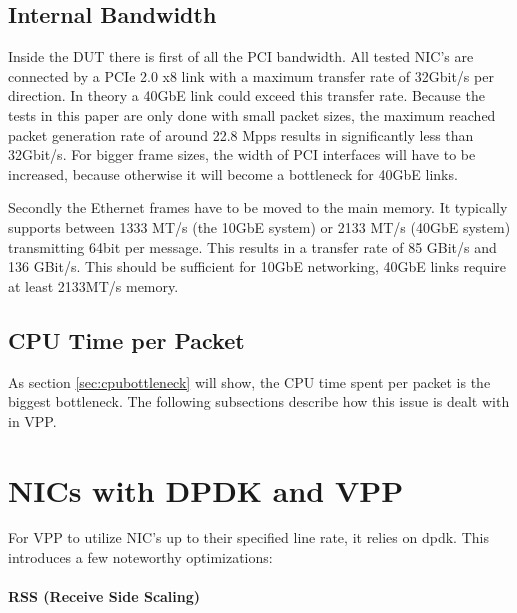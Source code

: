 
\subsection{Internal Bandwidth}


Inside the DUT there is first of all the PCI bandwidth. All tested
NIC's are connected by a PCIe 2.0 x8 link with a maximum transfer rate
of 32Gbit/s per direction. In theory a 40GbE link could exceed this
transfer rate. Because the tests in this paper are only done with
small packet sizes, the maximum reached packet generation rate of
around 22.8 Mpps results in significantly less than 32Gbit/s. For
bigger frame sizes, the width of PCI interfaces will have to be
increased, because otherwise it will become a bottleneck for
40GbE links.


Secondly the Ethernet frames have to be moved to the main memory. It
typically supports between 1333 MT/s (the 10GbE system) or 2133 MT/s
(40GbE system) transmitting 64bit per message. This results in a
transfer rate of 85 GBit/s and 136 GBit/s. This should be sufficient
for 10GbE networking, 40GbE links require at least 2133MT/s memory.

\subsection{CPU Time per Packet}

As section \ref{sec:cpubottleneck} will show, the CPU time spent per
packet is the biggest bottleneck. The following subsections describe
how this issue is dealt with in VPP.




\section{NICs with DPDK and VPP}

For VPP to utilize NIC's up to their specified line rate, it relies on
\Ac{dpdk}. This introduces a few noteworthy optimizations:

\paragraph{RSS (Receive Side Scaling)}
\label{sec:rss}

